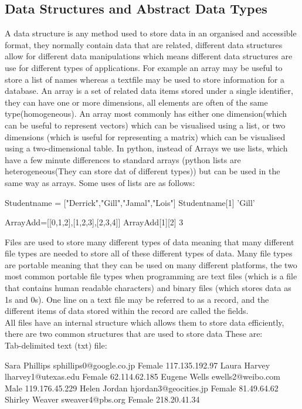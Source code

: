 \subsection{Data Structures and Abstract Data Types}
  A data structure is any method used to store data in an organised and accessible format, they normally contain data that are related, different data structures allow for different data manipulations which means different data structures are use for different types of applications. For example an array may be useful to store a list of names whereas a textfile may be used to store information for a database.
  An array is a set of related data items stored under a single identifier, they can have one or more dimensions, all elements are often of the same type(homogeneous). An array most commonly has either one dimension(which can be useful to represent vectors) which can be visualised using a list, or two dimensions (which is useful for representing a matrix) which can be visualised using a two-dimensional table. In python, instead of Arrays we use lists, which have a few minute differences to standard arrays (python lists are heterogeneous(They can store dat of different types)) but can be used in the same way as arrays. Some uses of lists are as follows:
  \begin{python}
Studentname = ["Derrick","Gill","Jamal","Lois"]
Studentname[1]
'Gill'

ArrayAdd=[[0,1,2],[1,2,3],[2,3,4]]
ArrayAdd[1][2]
3		\end{python}
  Files are used to store many different types of data meaning that many different file types are needed to store all of these different types of data. Many file types are portable meaning that they can be used on many different platforms, the two most common portable file types when programming are text files (which is a file that contains human readable characters) and binary files (which stores data as 1s and 0s). One line on a text file may be referred to as a record, and the different items of data stored within the record are called the fields.\\
  All files have an internal structure which allows them to store data efficiently, there are two common structures that are used to store data These are:\\
  Tab-delimited text (txt) file:
  \begin{csv}
Sara	Phillips	sphillips0@google.co.jp	Female	117.135.192.97
Laura	Harvey	lharvey1@utexas.edu	Female	62.114.62.185
Eugene	Wells	ewells2@weibo.com	Male	119.176.45.229
Helen	Jordan	hjordan3@geocities.jp	Female	81.49.64.62
Shirley	Weaver	sweaver4@pbs.org	Female	218.20.41.34	\end{csv}
